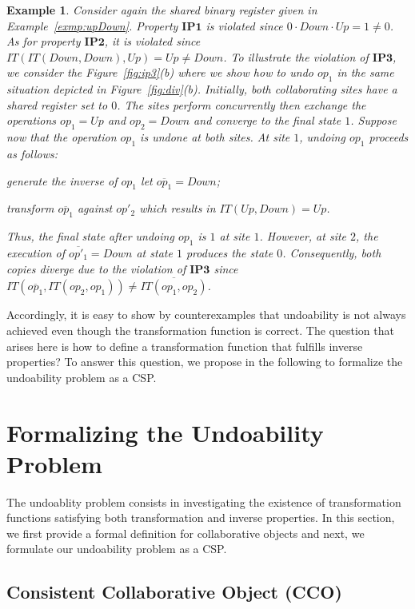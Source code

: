 \documentclass[submission,copyright,creativecommons]{eptcs}
\newtheorem{example}{Example}
\begin{document}
\begin{example}\label{exmp:e14}
Consider again the shared binary register given in Example~\ref{exmp:upDown}.
Property $\mathbf{IP1}$ is violated since $0\cdot Down \cdot Up =1 \neq 0$. As for  property $\mathbf{IP2}$, it is violated since $IT(IT(Down, Down),Up)=Up\neq Down$. 
To illustrate the violation of $\mathbf{IP3}$, we consider  the Figure~\ref{fig:ip3}(b) where we show how to undo $op_1$ in the same situation depicted in Figure~\ref{fig:div}(b). Initially, both collaborating sites have a shared register set to   $0$. The sites perform concurrently then exchange the   operations $op_1=Up$ and $op_2=Down$ and converge to the final state $1$. Suppose now that the operation $op_1$ is undone at both sites.
At site $1$, undoing $op_1$ proceeds as follows:
\begin{inparaenum}[(i)]
\item  generate the  inverse of $op_1$ let $\overline{op_1}=Down$;
\item transform $\overline{op_1}$ against $op'_2$ which results in $IT(Up, Down)=Up$.
\end{inparaenum}  Thus, the final state after undoing $op_1$ is $1$ at site $1$. However, at site $2$, the execution of $\overline{op'_1}=Down$ at state $1$ produces the state $0$.
Consequently, both copies diverge due to the violation of $\mathbf{IP3}$  since $IT(\overline{op_1}, IT(op_2,op_1))\neq  \overline{IT(op_1,op_2)}$.
\end{example} 

Accordingly, it is easy to show by counterexamples that undoability is not always achieved even though the transformation function is correct. The question that arises here is how to define a transformation function that fulfills inverse properties? To answer this question, we propose in the following  to formalize the undoability problem as a CSP.

\section{Formalizing the Undoability Problem}\label{sec:formalProbStatement}
The undoablity problem  consists in investigating the existence of transformation functions satisfying both transformation and inverse
properties. In this section, we first provide a formal definition for collaborative objects and next, we formulate our undoability problem as a CSP.

\subsection{Consistent Collaborative Object (CCO)}
 
\end{document}
